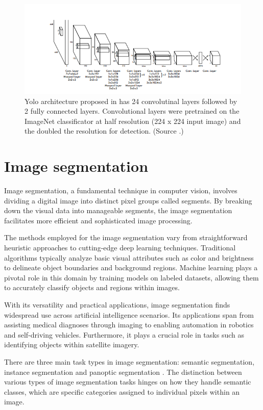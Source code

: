 \begin{figure}
  \centering
  \includegraphics[width=\linewidth]{text/chapter_03/imgs/YOLO_architecture}
  \caption{Yolo architecture proposed in \cite{YOLORedmon2016} has 24 convolutinal layers followed by 2 fully connected layers. Convolutional layers were pretrained on the ImageNet classificator at half resolution (224 x 224 input image) and the doubled the resolution for detection. (Source \cite{YOLORedmon2016}.)}
  \label{fig:yoloArchitecture}
\end{figure}


\section{Image segmentation}
Image segmentation, a fundamental technique in computer vision, involves dividing a digital image into distinct pixel groups called segments. By breaking down the visual data into manageable segments, the image segmentation facilitates more efficient and sophisticated image processing.

The methods employed for the image segmentation vary from straightforward heuristic approaches to cutting-edge deep learning techniques. Traditional algorithms typically analyze basic visual attributes such as color and brightness to delineate object boundaries and background regions. Machine learning plays a pivotal role in this domain by training models on labeled datasets, allowing them to accurately classify objects and regions within images.

With its versatility and practical applications, image segmentation finds widespread use across artificial intelligence scenarios. Its applications span from assisting medical diagnoses through imaging to enabling automation in robotics and self-driving vehicles. Furthermore, it plays a crucial role in tasks such as identifying objects within satellite imagery.

There are three main task types in image segmentation: semantic segmentation, instance segmentation and panoptic segmentation \cite{IBM}.
The distinction between various types of image segmentation tasks hinges on how they handle semantic classes, which are specific categories assigned to individual pixels within an image.

